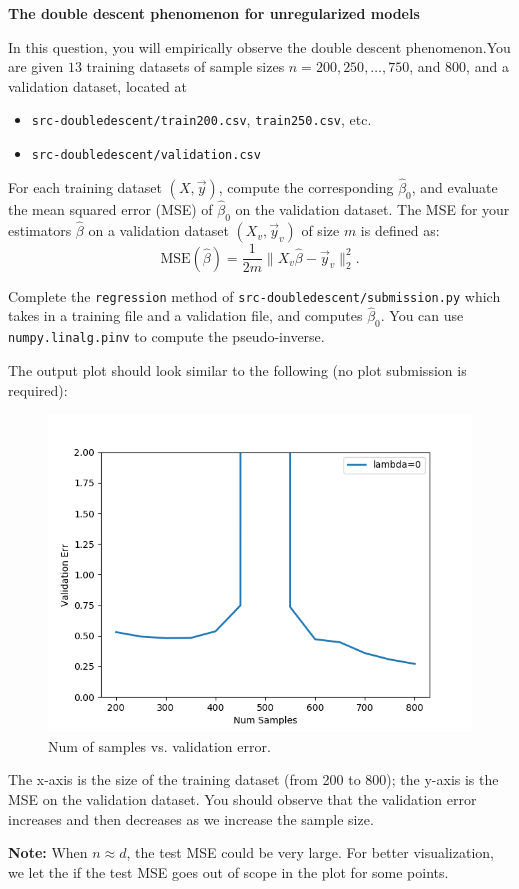 \item {}
\textbf{The double descent phenomenon for unregularized models}

In this question, you will empirically observe the double descent phenomenon.You are given $13$ training datasets of sample sizes $n  = 200, 250, \dots, 750$, and $800$, and a validation dataset, located at
\begin{itemize}
	\item \texttt{src-doubledescent/train200.csv}, \texttt{train250.csv}, etc.
	\item \texttt{src-doubledescent/validation.csv}
\end{itemize} 

For each training dataset $(X, \vec{y})$, compute the corresponding $\hat{\beta}_0$, and evaluate the mean squared error (MSE) of $\hat{\beta}_0$ on the validation dataset. The MSE for your estimators $\hat{\beta}$ on a validation dataset $(X_v, \vec{y}_v)$ of size $m$ is defined as: $$\text{MSE}(\hat{\beta}) = \frac{1}{2m} \|X_v \hat{\beta}-\vec{y}_v\|^2_2.$$


Complete the \texttt{regression} method of \texttt{src-doubledescent/submission.py} which takes in a training file and a validation file, and computes $\hat{\beta}_0$. You can use \texttt{numpy.linalg.pinv} to compute the pseudo-inverse.


The output plot should look similar to the following (no plot submission is required):

\begin{figure}[H]
	\centering
	\vspace{-2mm}
	\includegraphics[width=0.65\linewidth]{04-doubledescent/unreg.png}
	\caption{Num of samples vs. validation error.}
	\centering
\end{figure}

The x-axis is the size of the training dataset (from 200 to 800); the y-axis is the MSE on the validation dataset. You should observe that the validation error increases and then decreases as we increase the sample size.

\textbf{Note:} When $n\approx d$, the test MSE could be very large. For better visualization, we let the if the test MSE goes out of scope in the plot for some points.